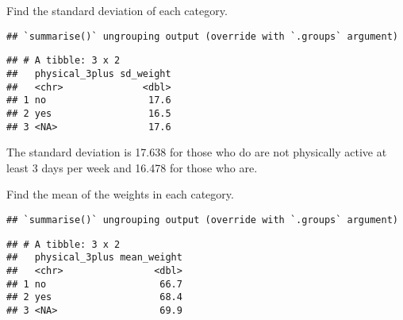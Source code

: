 \documentclass[
]{article}
\newenvironment{Shaded}{\begin{snugshade}}{\end{snugshade}}
\newcommand{\DataTypeTok}[1]{\textcolor[rgb]{0.13,0.29,0.53}{#1}}
\newcommand{\KeywordTok}[1]{\textcolor[rgb]{0.13,0.29,0.53}{\textbf{#1}}}
\newcommand{\NormalTok}[1]{#1}
\newcommand{\OperatorTok}[1]{\textcolor[rgb]{0.81,0.36,0.00}{\textbf{#1}}}
\newcommand{\OtherTok}[1]{\textcolor[rgb]{0.56,0.35,0.01}{#1}}
\newcommand{\StringTok}[1]{\textcolor[rgb]{0.31,0.60,0.02}{#1}}
\begin{document}
Find the standard deviation of each category.

\begin{Shaded}
\end{Shaded}

\begin{verbatim}
## `summarise()` ungrouping output (override with `.groups` argument)
\end{verbatim}

\begin{verbatim}
## # A tibble: 3 x 2
##   physical_3plus sd_weight
##   <chr>              <dbl>
## 1 no                  17.6
## 2 yes                 16.5
## 3 <NA>                17.6
\end{verbatim}

The standard deviation is 17.638 for those who do are not physically
active at least 3 days per week and 16.478 for those who are.

Find the mean of the weights in each category.

\begin{Shaded}
\end{Shaded}

\begin{verbatim}
## `summarise()` ungrouping output (override with `.groups` argument)
\end{verbatim}

\begin{verbatim}
## # A tibble: 3 x 2
##   physical_3plus mean_weight
##   <chr>                <dbl>
## 1 no                    66.7
## 2 yes                   68.4
## 3 <NA>                  69.9
\end{verbatim}
\end{document}
